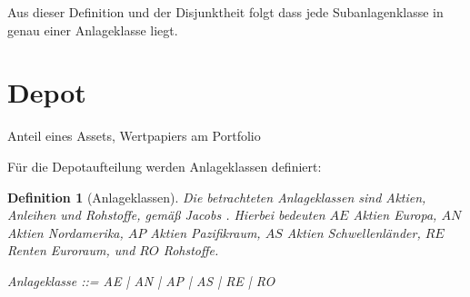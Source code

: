 \documentclass[12pt]{scrartcl}
\newtheorem{genericdef}{Generic Definition}[section]
\newtheorem{zdef}{Definition}[section]
\newcommand{\dsum}{\Sigma}
\begin{document}
Aus dieser Definition und der Disjunktheit folgt dass jede
Subanlagenklasse in genau einer Anlageklasse liegt.  


\section{Depot}
\label{sec:depot}
Anteil eines Assets, Wertpapiers am Portfolio


Für die Depotaufteilung werden Anlageklassen definiert:

\begin{zdef}[Anlageklassen]
  \label{zdef:anlageklassen}
  Die betrachteten Anlageklassen sind Aktien, Anleihen und Rohstoffe,
  gemäß Jacobs \cite{Jacobs2016}. Hierbei bedeuten $AE$ Aktien Europa,
  $AN$ Aktien Nordamerika, $AP$ Aktien Pazifikraum, $AS$ Aktien
  Schwellenländer, $RE$ Renten Euroraum, und $RO$ Rohstoffe. 
  \begin{zed}
    Anlageklasse ::= AE | AN | AP | AS | RE | RO 
  \end{zed}
\end{zdef}



\end{document}
